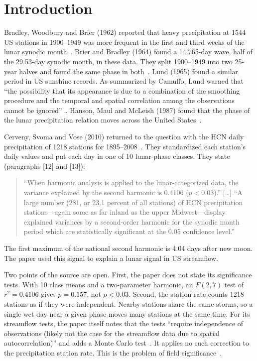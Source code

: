 \documentclass[11pt]{article}
\begin{document}
\section{Introduction}
Bradley, Woodbury and Brier (1962) reported that heavy precipitation at 1544 US stations in 1900--1949 was more frequent in the first and third weeks of the lunar synodic month~\cite{bradley1962}. Brier and Bradley (1964) found a 14.765-day wave, half of the 29.53-day synodic month, in these data. They split 1900--1949 into two 25-year halves and found the same phase in both~\cite{brier1964}. Lund (1965) found a similar period in US sunshine records. As summarized by Camuffo, Lund warned that ``the possibility that its appearance is due to a combination of the smoothing procedure and the temporal and spatial correlation among the observations cannot be ignored''~\cite{lund1965,camuffo2001}. Hanson, Maul and McLeish (1987) found that the phase of the lunar precipitation relation moves across the United States~\cite{hanson1987}.

Cerveny, Svoma and Vose (2010) returned to the question with the HCN daily precipitation of 1218 stations for 1895--2008~\cite{cerveny2010}. They standardized each station's daily values and put each day in one of 10 lunar-phase classes. They state (paragraphs [12] and [13]):

\begin{quote}
``When harmonic analysis is applied to the lunar-categorized data, the variance explained by the second harmonic is 0.4106 ($p<0.03$).'' [\dots] ``A large number (281, or 23.1 percent of all stations) of HCN precipitation stations---again some as far inland as the upper Midwest---display explained variances by a second-order harmonic for the synodic month period which are statistically significant at the 0.05 confidence level.''
\end{quote}

The first maximum of the national second harmonic is 4.04 days after new moon. The paper used this signal to explain a lunar signal in US streamflow.

Two points of the source are open. First, the paper does not state its significance tests. With 10 class means and a two-parameter harmonic, an $F(2,7)$ test of $r^2=0.4106$ gives $p=0.157$, not $p<0.03$. Second, the station rate counts 1218 stations as if they were independent. Nearby stations share the same storms, so a single wet day near a given phase moves many stations at the same time. For its streamflow tests, the paper itself notes that the tests ``require independence of observations (likely not the case for the streamflow data due to spatial autocorrelation)'' and adds a Monte Carlo test~\cite[para.~5]{cerveny2010}. It applies no such correction to the precipitation station rate. This is the problem of field significance~\cite{livezey1983}.
\end{document}
